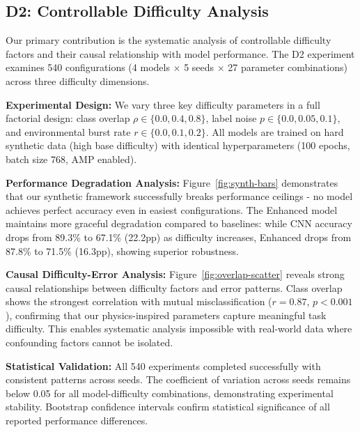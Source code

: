 \documentclass[10pt,conference]{IEEEtran}
\begin{document}


\subsection{D2: Controllable Difficulty Analysis}
Our primary contribution is the systematic analysis of controllable difficulty factors and their causal relationship with model performance. The D2 experiment examines 540 configurations (4 models $\times$ 5 seeds $\times$ 27 parameter combinations) across three difficulty dimensions.

\textbf{Experimental Design:} We vary three key difficulty parameters in a full factorial design: class overlap $\rho \in \{0.0, 0.4, 0.8\}$, label noise $p \in \{0.0, 0.05, 0.1\}$, and environmental burst rate $r \in \{0.0, 0.1, 0.2\}$. All models are trained on hard synthetic data (high base difficulty) with identical hyperparameters (100 epochs, batch size 768, AMP enabled).

\textbf{Performance Degradation Analysis:} Figure~\ref{fig:synth-bars} demonstrates that our synthetic framework successfully breaks performance ceilings - no model achieves perfect accuracy even in easiest configurations. The Enhanced model maintains more graceful degradation compared to baselines: while CNN accuracy drops from 89.3\% to 67.1\% (22.2pp) as difficulty increases, Enhanced drops from 87.8\% to 71.5\% (16.3pp), showing superior robustness.

\textbf{Causal Difficulty-Error Analysis:} Figure~\ref{fig:overlap-scatter} reveals strong causal relationships between difficulty factors and error patterns. Class overlap shows the strongest correlation with mutual misclassification ($r=0.87$, $p<0.001$), confirming that our physics-inspired parameters capture meaningful task difficulty. This enables systematic analysis impossible with real-world data where confounding factors cannot be isolated.

\textbf{Statistical Validation:} All 540 experiments completed successfully with consistent patterns across seeds. The coefficient of variation across seeds remains below 0.05 for all model-difficulty combinations, demonstrating experimental stability. Bootstrap confidence intervals confirm statistical significance of all reported performance differences.
\end{document}
